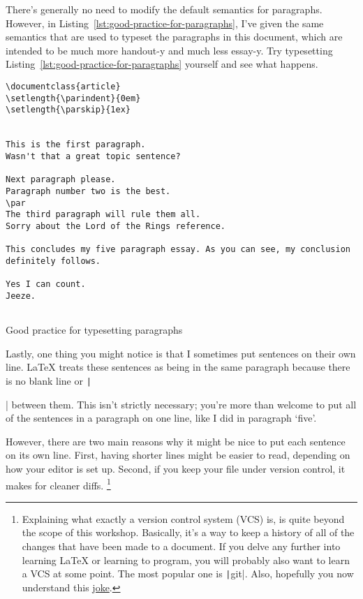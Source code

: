 There's generally no need to modify the default semantics for paragraphs.
However, in Listing~\ref{lst:good-practice-for-paragraphs}, I've given the same semantics that are used to typeset the paragraphs in this document, which are intended to be much more handout-y and much less essay-y.
Try typesetting Listing~\ref{lst:good-practice-for-paragraphs} yourself and see what happens.

\begin{listing}[htbp]
	\centering
	\begin{verbatim}
\documentclass{article}
\setlength{\parindent}{0em}
\setlength{\parskip}{1ex}


This is the first paragraph.
Wasn't that a great topic sentence?

Next paragraph please.
Paragraph number two is the best.
\par
The third paragraph will rule them all.
Sorry about the Lord of the Rings reference.

This concludes my five paragraph essay. As you can see, my conclusion definitely follows.

Yes I can count.
Jeeze.


	\end{verbatim}
	\caption{Good practice for typesetting paragraphs}
	\label{lst:good-practice-for-paragraphs}
\end{listing}

Lastly, one thing you might notice is that I sometimes put sentences on their own line.
\LaTeX{} treats these sentences as being in the same paragraph because there is no blank line or \texttt|\par| between them.
This isn't strictly necessary; you're more than welcome to put all of the sentences in a paragraph on one line, like I did in paragraph `five'.

However, there are two main reasons why it might be nice to put each sentence on its own line.
First, having shorter lines might be easier to read, depending on how your editor is set up.
Second, if you keep your  file under version control, it makes for cleaner diffs.%
\footnote{%
Explaining what exactly a version control system (VCS) is, is quite beyond the scope of this workshop.
Basically, it's a way to keep a history of all of the changes that have been made to a document.
If you delve any further into learning \LaTeX{} or learning to program, you will probably also want to learn a VCS at some point.
The most popular one is \texttt|git|.
Also, hopefully you now understand this \href{https://xkcd.com/1285/}{joke}.%
}